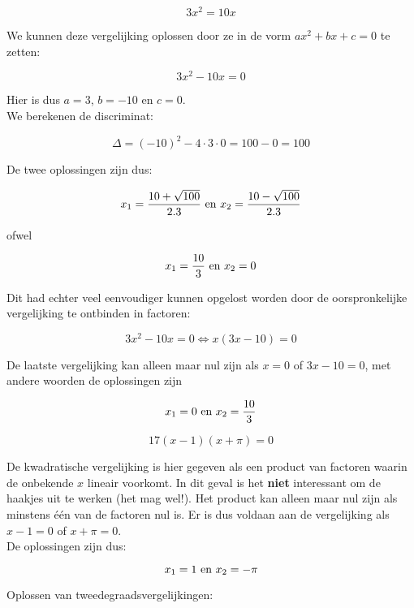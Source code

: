 \begin{voorbeeld}
	\[3x^2=10x\]

We kunnen deze vergelijking oplossen door ze in de vorm $ax^2+bx+c=0$ te zetten:

\[3x^2-10x=0\]

Hier is dus $a=3$, $b=-10$ en $c=0$.\\
We berekenen de discriminat:

\[\Delta=(-10)^2-4\cdot 3 \cdot 0=100-0=100 \]

De twee oplossingen zijn dus:

\[ x_{1}=\frac{10+\sqrt{100}}{2.3} \textup{  en  } x_{2}=\frac{10-\sqrt{100}}{2.3} \]

ofwel

\[ x_{1}=\frac{10}{3} \textup{  en  } x_{2}=0 \]

Dit had echter veel eenvoudiger kunnen opgelost worden door de oorspronkelijke vergelijking te ontbinden in factoren:

\[3x^2-10x=0 \Leftrightarrow x(3x-10)=0  \]

De laatste vergelijking kan alleen maar nul zijn als $x=0$ of $3x-10=0$, met andere woorden de oplossingen zijn

\[ x_{1}=0 \textup{  en  } x_{2}=\frac{10}{3} \]

\end{voorbeeld}
\begin{voorbeeld}
	

\[ 17(x-1)(x+\pi)=0 \]

De kwadratische vergelijking is hier gegeven als een product van factoren waarin de onbekende $x$ lineair voorkomt. In dit geval is het {\bf niet } interessant om de haakjes uit te werken (het mag wel!). Het product kan alleen maar nul zijn als minstens \'{e}\'{e}n van de factoren nul is. Er is dus voldaan aan de vergelijking als $x-1=0$ of $x+\pi=0$.\\
De oplossingen zijn dus:

\[ x_{1}=1 \textup{  en  } x_{2}=-\pi \]

\end{voorbeeld}


Oplossen van tweedegraadsvergelijkingen:\\

